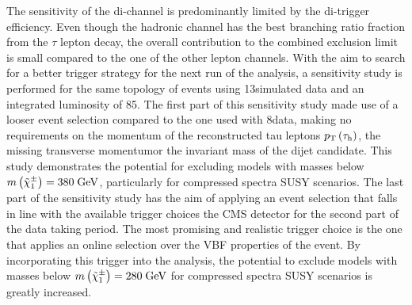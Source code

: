 The sensitivity of the di-\hadtau channel is predominantly limited by the di-\hadtau trigger efficiency. Even though the hadronic channel has the best branching ratio fraction from the $\tau$ lepton decay, the overall contribution to the combined exclusion limit is small compared to the one of the other lepton channels. With the aim to search for a better trigger strategy for the next run of the analysis, a sensitivity study is performed for the same topology of events using 13\tev simulated data and an integrated luminosity of 85\invfb. The first part of this sensitivity study made use of a looser event selection compared to the one used with 8\tev data, making no requirements on the momentum of the reconstructed tau leptons  $p_{\text{T}}\left(\tau_{\text{h}}\right)$, the missing transverse momentum\met or the invariant mass of the dijet candidate\mjj. This study demonstrates the potential for excluding models with \charginopm masses below $m\left(\tilde{\chi}^{\pm}_{1}\right) = 380\;\text{Ge}\kern-0.06667em\text{V}$, particularly for compressed spectra SUSY scenarios. The last part of the sensitivity study has the aim of applying an event selection that falls in line with the available trigger choices the CMS detector for the second part of the data taking period. The most promising and realistic trigger choice is the one that applies an online selection over the VBF properties of the event. By incorporating this trigger into the analysis, the potential to exclude models with \charginopm masses below $m\left(\tilde{\chi}^{\pm}_{1}\right) = 280\;\text{Ge}\kern-0.06667em\text{V}$ for compressed spectra SUSY scenarios is greatly increased.